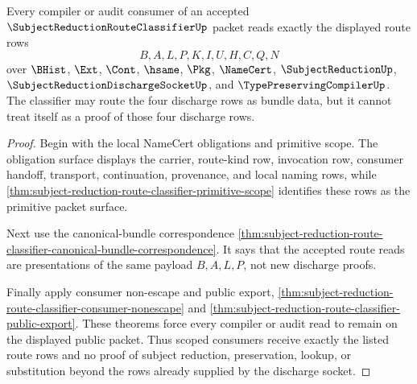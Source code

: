 \begin{theorem}
\label{thm:subject-reduction-route-classifier-scoped-consumer-exactness}
Every compiler or audit consumer of an accepted
$\SubjectReductionRouteClassifierUp$ packet reads exactly the displayed route
rows
$$
B,A,L,P,K,I,U,H,C,Q,N
$$
over $\BHist$, $\Ext$, $\Cont$, $\hsame$, $\Pkg$, $\NameCert$,
$\SubjectReductionUp$, $\SubjectReductionDischargeSocketUp$, and
$\TypePreservingCompilerUp$. The classifier may route the four discharge rows
as bundle data, but it cannot treat itself as a proof of
those four discharge rows.
\end{theorem}
\begin{proof}
Begin with the local NameCert obligations and primitive scope. The obligation
surface displays the carrier, route-kind row, invocation row, consumer handoff,
transport, continuation, provenance, and local naming rows, while
\autoref{thm:subject-reduction-route-classifier-primitive-scope} identifies
these rows as the primitive packet surface.

Next use the canonical-bundle correspondence
\autoref{thm:subject-reduction-route-classifier-canonical-bundle-correspondence}.
It says that the accepted route reads are presentations of the same
payload $B,A,L,P$, not new discharge proofs.

Finally apply consumer non-escape and public export,
\autoref{thm:subject-reduction-route-classifier-consumer-nonescape} and
\autoref{thm:subject-reduction-route-classifier-public-export}. These theorems
force every compiler or audit read to remain on the displayed public packet.
Thus scoped consumers receive exactly the listed route rows and no proof of
subject reduction, preservation, lookup, or substitution beyond the rows
already supplied by the discharge socket.
\end{proof}

